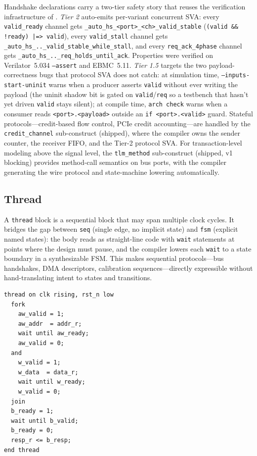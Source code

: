 \documentclass[manuscript]{acmart}
\begin{document}
Handshake declarations carry a two-tier safety story that reuses the verification infrastructure of . \emph{Tier 2} auto-emits per-variant concurrent SVA: every \texttt{valid\_ready} channel gets \texttt{\_auto\_hs\_<port>\_<ch>\_valid\_stable} (\texttt{(valid \&\& !ready) |=> valid}), every \texttt{valid\_stall} channel gets \texttt{\_auto\_hs\_..\_valid\_stable\_while\_stall}, and every \texttt{req\_ack\_4phase} channel gets \texttt{\_auto\_hs\_..\_req\_holds\_until\_ack}. Properties were verified on Verilator~5.034 \texttt{--assert} and EBMC~5.11. \emph{Tier 1.5} targets the two payload-correctness bugs that protocol SVA does not catch: at simulation time, \texttt{--inputs-start-uninit} warns when a producer asserts \texttt{valid} without ever writing the payload (the uninit shadow bit is gated on \texttt{valid}/\texttt{req} so a testbench that hasn't yet driven \texttt{valid} stays silent); at compile time, \texttt{arch check} warns when a consumer reads \texttt{<port>.<payload>} outside an \texttt{if <port>.<valid>} guard. Stateful protocols---credit-based flow control, PCIe credit accounting---are handled by the \texttt{credit\_channel} sub-construct (shipped), where the compiler owns the sender counter, the receiver FIFO, and the Tier-2 protocol SVA. For transaction-level modeling above the signal level, the \texttt{tlm\_method} sub-construct (shipped, v1 blocking) provides method-call semantics on bus ports, with the compiler generating the wire protocol and state-machine lowering automatically.

\subsection{Thread}\label{sec:thread}

A \texttt{thread} block is a sequential block that may span multiple clock cycles. It bridges the gap between \texttt{seq} (single edge, no implicit state) and \texttt{fsm} (explicit named states): the body reads as straight-line code with \texttt{wait} statements at points where the design must pause, and the compiler lowers each \texttt{wait} to a state boundary in a synthesizable FSM. This makes sequential protocols---bus handshakes, DMA descriptors, calibration sequences---directly expressible without hand-translating intent to states and transitions.

\begin{lstlisting}[language=Arch,caption={AXI write transaction as a thread},label={lst:thread}]
thread on clk rising, rst_n low
  fork
    aw_valid = 1;
    aw_addr  = addr_r;
    wait until aw_ready;
    aw_valid = 0;
  and
    w_valid = 1;
    w_data  = data_r;
    wait until w_ready;
    w_valid = 0;
  join
  b_ready = 1;
  wait until b_valid;
  b_ready = 0;
  resp_r <= b_resp;
end thread
\end{lstlisting}
\end{document}
